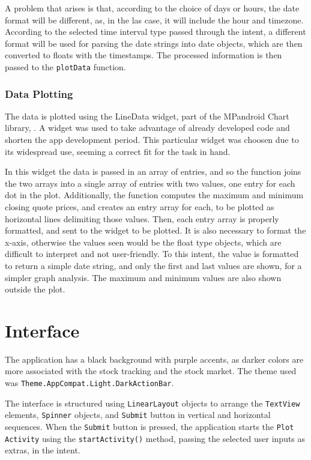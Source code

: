 \documentclass{article}
\begin{document}
A problem that arises is that, according to the choice of days or hours, the date format will be different, as, in the las case, it will include the hour and timezone.
According to the selected time interval type passed through the intent, a different format will be used for parsing the date strings into date objects, which are then converted to floats with the timestamps.
The processed information is then passed to the \texttt{plotData} function.

\subsubsection{Data Plotting}
The data is plotted using the LineData widget, part of the MPandroid Chart library, \cite{MPAndroidChart}.
A widget was used to take advantage of already developed code and shorten the app development period.
This particular widget was choosen due to its widespread use, seeming a correct fit for the task in hand.

In this widget the data is passed in an array of entries, and so the function joins the two arrays into a single array of entries with two values, one entry for each dot in the plot.
Additionally, the function computes the maximum and minimum closing quote prices, and creates an entry array for each, to be plotted as horizontal lines delimiting those values.
Then, each entry array is properly formatted, and sent to the widget to be plotted.
It is also necessary to format the x-axis, otherwise the values seen would be the float type objects, which are difficult to interpret and not user-friendly.
To this intent, the value is formatted to return a simple date string, and only the first and last values are shown, for a simpler graph analysis.
The maximum and minimum values are also shown outside the plot.

\clearpage
\section{Interface}
The application has a black background with purple accents, as darker colors are more associated with the stock tracking and the stock market. The theme used was \texttt{Theme.AppCompat.Light.DarkActionBar}.

The interface is structured using \texttt{LinearLayout} objects to arrange the \texttt{TextView} elements, \texttt{Spinner} objects, and \texttt{Submit} button in vertical and horizontal sequences. When the \texttt{Submit} button is pressed, the application starts the \texttt{Plot Activity} using the \texttt{startActivity()} method, passing the selected user inputs as extras, in the intent.
\end{document}
